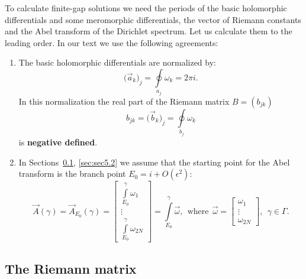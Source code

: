 \documentclass[12pt]{article}
\begin{document}
To calculate finite-gap solutions we need the periods of the basic holomorphic differentials and some meromorphic 
differentials, the vector of Riemann constants 
and the Abel transform of the Dirichlet spectrum. Let us calculate them to the leading order. In our text we use the following agreements:
\begin{enumerate}
\item The basic holomorphic differentials are normalized by:
\begin{equation}
\label{eq:omegas}
\big(\vec a_k\big)_j =  \oint\limits_{a_j}\omega_k = 2\pi i.
\end{equation}
In this normalization the real part of the Riemann matrix $B=(b_{jk})$
\begin{equation}
\label{eq:riemann0}
b_{jk}=\big(\vec b_k\big)_j =  \oint\limits_{b_j}\omega_k
\end{equation}
is \textbf{negative defined}.
\item In Sections~\ref{sec:sec5.1}, \ref{sec:sec5.2} we assume that the starting point for the Abel transform is the branch point  $E_0=i+O(\epsilon^2)$:
\begin{equation}
\label{eq:Abel}
\vec A(\gamma) = \vec A_{E_0}(\gamma) =  \left[\begin{array}{c} \int\limits_{E_0}^{\gamma} \omega_1 \\ \vdots \\ \int\limits_{E_0}^{\gamma} \omega_{2N} \end{array}\right] =
\int\limits_{E_0}^{\gamma} \vec\omega,  \ \ \mbox{where} \ \  \vec\omega =\left[\begin{array}{c} \omega_1 \\ \vdots \\ \omega_{2N} \end{array}\right], \ \ \gamma\in\Gamma.
\end{equation}
\end{enumerate}
\subsection{The Riemann matrix}
\label{sec:sec5.1}
\end{document}
